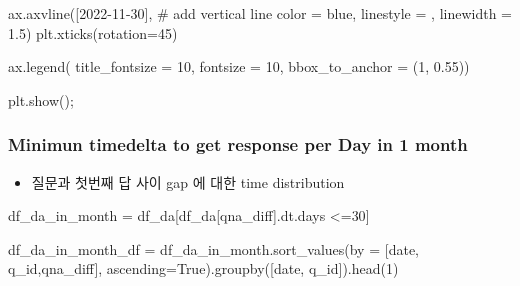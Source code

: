 \documentclass[
  letterpaper,
  DIV=11,
  numbers=noendperiod]{scrartcl}
\newenvironment{Shaded}{\begin{snugshade}}{\end{snugshade}}
\newcommand{\CommentTok}[1]{\textcolor[rgb]{0.37,0.37,0.37}{#1}}
\newcommand{\DecValTok}[1]{\textcolor[rgb]{0.68,0.00,0.00}{#1}}
\newcommand{\FloatTok}[1]{\textcolor[rgb]{0.68,0.00,0.00}{#1}}
\newcommand{\NormalTok}[1]{\textcolor[rgb]{0.00,0.23,0.31}{#1}}
\newcommand{\OperatorTok}[1]{\textcolor[rgb]{0.37,0.37,0.37}{#1}}
\newcommand{\StringTok}[1]{\textcolor[rgb]{0.13,0.47,0.30}{#1}}
\newcommand{\VariableTok}[1]{\textcolor[rgb]{0.07,0.07,0.07}{#1}}
\providecommand{\tightlist}{%
  \setlength{\itemsep}{0pt}\setlength{\parskip}{0pt}}\usepackage{longtable,booktabs,array}
\begin{document}
\begin{Shaded}
\begin{Highlighting}[]
\NormalTok{ax.axvline([}\StringTok{\textquotesingle{}2022{-}11{-}30\textquotesingle{}}\NormalTok{], }\CommentTok{\# add vertical line}
\NormalTok{           color }\OperatorTok{=} \StringTok{\textquotesingle{}blue\textquotesingle{}}\NormalTok{,}
\NormalTok{           linestyle }\OperatorTok{=} \StringTok{\textquotesingle{}{-}{-}\textquotesingle{}}\NormalTok{,}
\NormalTok{           linewidth }\OperatorTok{=} \FloatTok{1.5}\NormalTok{)}
\NormalTok{plt.xticks(rotation}\OperatorTok{=}\DecValTok{45}\NormalTok{)}



\NormalTok{ax.legend( title\_fontsize }\OperatorTok{=} \DecValTok{10}\NormalTok{, fontsize }\OperatorTok{=} \DecValTok{10}\NormalTok{,}
\NormalTok{          bbox\_to\_anchor }\OperatorTok{=}\NormalTok{ (}\DecValTok{1}\NormalTok{, }\FloatTok{0.55}\NormalTok{))}

\NormalTok{plt.show()}\OperatorTok{;}
\end{Highlighting}
\end{Shaded}

\subsubsection{Minimun timedelta to get response per Day in 1
month}\label{minimun-timedelta-to-get-response-per-day-in-1-month}

\begin{itemize}
\tightlist
\item
  질문과 첫번째 답 사이 gap 에 대한 time distribution
\end{itemize}

\begin{Shaded}
\begin{Highlighting}[]
\NormalTok{df\_da\_in\_month }\OperatorTok{=}\NormalTok{ df\_da[df\_da[}\StringTok{\textquotesingle{}qna\_diff\textquotesingle{}}\NormalTok{].dt.days }\OperatorTok{\textless{}=}\DecValTok{30}\NormalTok{]}
\end{Highlighting}
\end{Shaded}

\begin{Shaded}
\begin{Highlighting}[]
\NormalTok{df\_da\_in\_month\_df }\OperatorTok{=}\NormalTok{ df\_da\_in\_month.sort\_values(by }\OperatorTok{=}\NormalTok{ [}\StringTok{\textquotesingle{}date\textquotesingle{}}\NormalTok{, }\StringTok{\textquotesingle{}q\_id\textquotesingle{}}\NormalTok{,}\StringTok{\textquotesingle{}qna\_diff\textquotesingle{}}\NormalTok{], ascending}\OperatorTok{=}\VariableTok{True}\NormalTok{).groupby([}\StringTok{\textquotesingle{}date\textquotesingle{}}\NormalTok{, }\StringTok{\textquotesingle{}q\_id\textquotesingle{}}\NormalTok{]).head(}\DecValTok{1}\NormalTok{)}
\end{Highlighting}
\end{Shaded}
\end{document}
